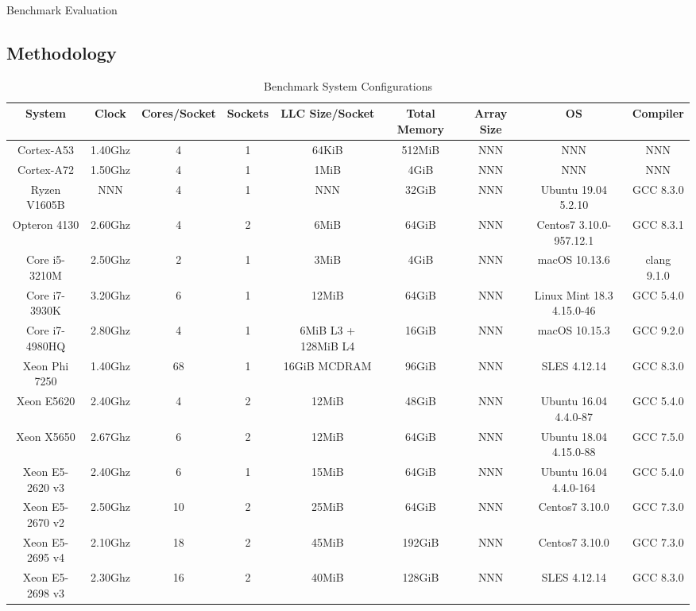 
Benchmark Evaluation

\subsection{Methodology}
\label{subsec:methodology}

\begin{table}
\caption{Benchmark System Configurations}
\label{tab:benchsys}
\begin{tabular}{ccccccccc}
\toprule
System&Clock&Cores/Socket&Sockets&LLC Size/Socket&Total Memory&Array Size&OS&Compiler\\
\midrule
Cortex-A53&1.40Ghz&4&1&64KiB&512MiB&NNN&NNN&NNN\\
Cortex-A72&1.50Ghz&4&1&1MiB&4GiB&NNN&NNN&NNN\\
Ryzen V1605B&NNN&4&1&NNN&32GiB&NNN&Ubuntu 19.04 5.2.10&GCC 8.3.0\\
Opteron 4130&2.60Ghz&4&2&6MiB&64GiB&NNN&Centos7 3.10.0-957.12.1&GCC 8.3.1\\
Core i5-3210M&2.50Ghz&2&1&3MiB&4GiB&NNN&macOS 10.13.6&clang 9.1.0\\
Core i7-3930K&3.20Ghz&6&1&12MiB&64GiB&NNN&Linux Mint 18.3 4.15.0-46&GCC 5.4.0\\
Core i7-4980HQ&2.80Ghz&4&1&6MiB L3 + 128MiB L4&16GiB&NNN&macOS 10.15.3&GCC 9.2.0\\
Xeon Phi 7250&1.40Ghz&68&1&16GiB MCDRAM&96GiB&NNN&SLES 4.12.14&GCC 8.3.0\\
Xeon E5620&2.40Ghz&4&2&12MiB&48GiB&NNN&Ubuntu 16.04 4.4.0-87&GCC 5.4.0\\
Xeon X5650&2.67Ghz&6&2&12MiB&64GiB&NNN&Ubuntu 18.04 4.15.0-88&GCC 7.5.0\\
Xeon E5-2620 v3&2.40Ghz&6&1&15MiB&64GiB&NNN&Ubuntu 16.04 4.4.0-164&GCC 5.4.0\\
Xeon E5-2670 v2&2.50Ghz&10&2&25MiB&64GiB&NNN&Centos7 3.10.0&GCC 7.3.0\\
Xeon E5-2695 v4&2.10Ghz&18&2&45MiB&192GiB&NNN&Centos7 3.10.0&GCC 7.3.0\\
Xeon E5-2698 v3&2.30Ghz&16&2&40MiB&128GiB&NNN&SLES 4.12.14&GCC 8.3.0\\
\bottomrule
\end{tabular}
\end{table}

